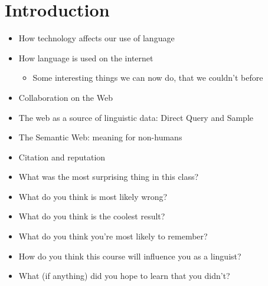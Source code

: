 \documentclass[a4paper,landscape,headrule,footrule,xetex]{foils}
\begin{document}


\maketitle




\section{Introduction}


\begin{itemize}
\item How technology affects our use of language
 \item How language is used on the internet
   \begin{itemize}
   \item Some interesting things we can now do, that we couldn't before 
   \end{itemize}
 \item Collaboration on the Web
 \item The web as a source of linguistic data: Direct Query and Sample
 \item The Semantic Web: meaning for non-humans
 \item Citation and reputation
\end{itemize}

\begin{itemize}
\item What was the most surprising thing in this class?
\item What do you think is most likely wrong?
\item What do you think is the coolest result?
\item What do you think you’re most likely to
remember?
\item How do you think this course will influence you as a linguist?
\item What (if anything) did you hope to learn that you didn't?
\end{itemize}
\end{document}
